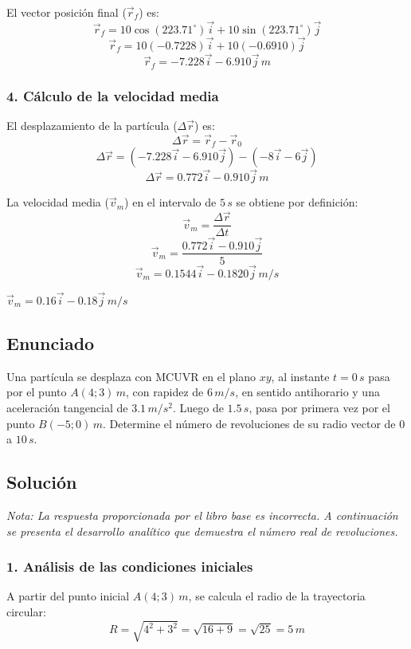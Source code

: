 \documentclass[12pt, a4paper]{article}
\begin{document}
El vector posición final ($\vec{r}_f$) es:
$$ \vec{r}_f = 10\cos(223.71^\circ)\vec{i} + 10\sin(223.71^\circ)\vec{j} $$
$$ \vec{r}_f = 10(-0.7228)\vec{i} + 10(-0.6910)\vec{j} $$
$$ \vec{r}_f = -7.228\vec{i} - 6.910\vec{j} \, \si{m} $$

\subsubsection*{4. Cálculo de la velocidad media}
El desplazamiento de la partícula ($\Delta\vec{r}$) es:
$$ \Delta\vec{r} = \vec{r}_f - \vec{r}_0 $$
$$ \Delta\vec{r} = (-7.228\vec{i} - 6.910\vec{j}) - (-8\vec{i} - 6\vec{j}) $$
$$ \Delta\vec{r} = 0.772\vec{i} - 0.910\vec{j} \, \si{m} $$

La velocidad media ($\vec{v}_m$) en el intervalo de $5 \, \si{s}$ se obtiene por definición:
$$ \vec{v}_m = \frac{\Delta\vec{r}}{\Delta t} $$
$$ \vec{v}_m = \frac{0.772\vec{i} - 0.910\vec{j}}{5} $$
$$ \vec{v}_m = 0.1544\vec{i} - 0.1820\vec{j} \, \si{m/s} $$

\begin{tcolorbox}[colback=green!5!white, colframe=green!50!black, title=Respuesta Final]
\centering \Large $\vec{v}_m = 0.16\vec{i} - 0.18\vec{j} \, \si{m/s}$
\end{tcolorbox}

\newpage

\subsection*{Enunciado}
Una partícula se desplaza con MCUVR en el plano $xy$, al instante $t = 0 \, \si{s}$ pasa por el punto $A(4; 3) \, \si{m}$, con rapidez de $6 \, \si{m/s}$, en sentido antihorario y una aceleración tangencial de $3.1 \, \si{m/s^2}$. Luego de $1.5 \, \si{s}$, pasa por primera vez por el punto $B(-5; 0) \, \si{m}$. Determine el número de revoluciones de su radio vector de $0$ a $10 \, \si{s}$. 

\subsection*{Solución}

\textit{Nota: La respuesta proporcionada por el libro base es incorrecta. A continuación se presenta el desarrollo analítico que demuestra el número real de revoluciones.}

\subsubsection*{1. Análisis de las condiciones iniciales}
A partir del punto inicial $A(4; 3) \, \si{m}$, se calcula el radio de la trayectoria circular:
$$ R = \sqrt{4^2 + 3^2} = \sqrt{16 + 9} = \sqrt{25} = 5 \, \si{m} $$
\end{document}
